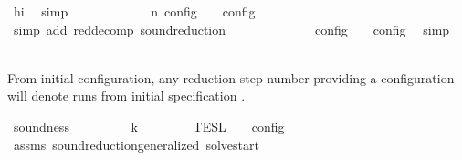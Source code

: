 \begin{isabellebody}
\ hi\ \isamarkupfalse%
\ simp\isanewline
\ \ \ \ \ \ \ \ \isamarkupfalse%
\ \isamarkupfalse%
\ {\isacartoucheopen}{\isasymlbrakk}\ {\isasymS}\isactrlsub n\ {\isasymrbrakk}\isactrlsub c\isactrlsub o\isactrlsub n\isactrlsub f\isactrlsub i\isactrlsub g\ {\isasymsupseteq}\ {\isasymlbrakk}\ {\isasymS}\ {\isasymrbrakk}\isactrlsub c\isactrlsub o\isactrlsub n\isactrlsub f\isactrlsub i\isactrlsub g{\isacartoucheclose}\ \isamarkupfalse%
\ {\isacharparenleft}simp\ add{\isacharcolon}\ red{\isacharunderscore}decomp\ sound{\isacharunderscore}reduction{\isacharprime}{\isacharparenright}\isanewline
\ \ \ \ \ \ \ \ \isamarkupfalse%
\ \isamarkupfalse%
\ {\isacartoucheopen}{\isasymlbrakk}\ {\isasymS}\ {\isasymrbrakk}\isactrlsub c\isactrlsub o\isactrlsub n\isactrlsub f\isactrlsub i\isactrlsub g\ {\isasymsupseteq}\ {\isasymlbrakk}\ {\isasymS}\ {\isasymrbrakk}\isactrlsub c\isactrlsub o\isactrlsub n\isactrlsub f\isactrlsub i\isactrlsub g{\isacartoucheclose}\ \isamarkupfalse%
\ simp\isanewline
\ \ \ \ \ \ \isamarkupfalse%
\isanewline
\ \ \isamarkupfalse%
\isanewline
{}\isamarkupfalse%
%
\endisatagproof
{\isafoldproof}%
%
\isadelimproof
%
\endisadelimproof
%
\begin{isamarkuptext}%
From initial configuration, any reduction step number  providing a
  configuration \isa{{\isasymS}} will denote runs from initial specification \isa{{\isasymPsi}}.%
\end{isamarkuptext}\isamarkuptrue%
\isamarkupfalse%
\ soundness{\isacharcolon}\isanewline
\ \ \ {\isacartoucheopen}{\isacharparenleft}{\isacharbrackleft}{\isacharbrackright}{\isacharcomma}\ {}\ {\isasymturnstile}\ {\isasymPsi}\ {\isasymtriangleright}\ {\isacharbrackleft}{\isacharbrackright}{\isacharparenright}\ {\isasymhookrightarrow}\isactrlbsup k\isactrlesup \ {\isasymS}{\isacartoucheclose}\isanewline
\ \ \ \ \ {\isacartoucheopen}{\isasymlbrakk}{\isasymlbrakk}\ {\isasymPsi}\ {\isasymrbrakk}{\isasymrbrakk}\isactrlsub T\isactrlsub E\isactrlsub S\isactrlsub L\ {\isasymsupseteq}\ {\isasymlbrakk}\ {\isasymS}\ {\isasymrbrakk}\isactrlsub c\isactrlsub o\isactrlsub n\isactrlsub f\isactrlsub i\isactrlsub g{\isacartoucheclose}\isanewline
%
\isadelimproof
\ \ %
\endisadelimproof
%
\isatagproof
{}\isamarkupfalse%
\ assms\ sound{\isacharunderscore}reduction{\isacharunderscore}generalized\ solve{\isacharunderscore}start\ \isamarkupfalse%

\end{isabellebody}
